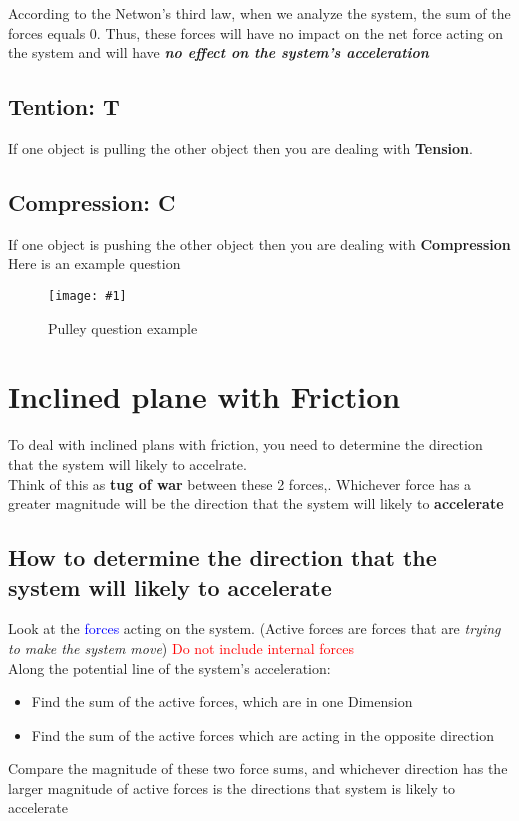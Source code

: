 \documentclass[10pt]{report}
\theoremstyle{remark}
\newcommand{\mypic}[3]{
    \begin{figure}[h!]
        \centering
        \texttt{[image: \#1]}
        \caption{#2}
    \end{figure}
}
\begin{document}
According to the Netwon's third law, when we analyze the system, the sum of the forces equals 0. 
Thus, these forces will have no impact on the net force acting on the system and will have 
\textbf{\textit{no effect on the system's acceleration}}

\subsection{Tention: T}
If one object is pulling the other object then you are dealing with \textbf{Tension}.

\subsection{Compression: C}
If one object is pushing the other object then you are dealing with \textbf{Compression}
\\

Here is an example question
\mypic{graph/example10.png}{Pulley question example}{0.6}

\section{Inclined plane with Friction}
To deal with inclined plans with friction, you need to determine the direction that the system will likely to accelrate. 
\\

Think of this as \textbf{tug of war} between these 2 forces,. Whichever force has a greater magnitude will be the direction that the system will 
likely to \textbf{accelerate}

\subsection{How to determine the direction that the system will likely to accelerate}
Look at the \textcolor{blue}{forces} acting on the system. (Active forces are forces that are \textit{trying to make the system move})
\textcolor{red}{Do not include internal forces} \\

Along the potential line of the system's acceleration:
\begin{itemize}
    \item Find the sum of the active forces, which are in one Dimension
    \item Find the sum of the active forces which are acting in the opposite direction
\end{itemize}
Compare the magnitude of these two force sums, and whichever direction has the larger magnitude of active forces is the directions that 
system is likely to accelerate
\end{document}
